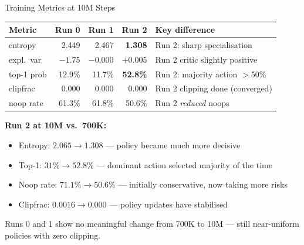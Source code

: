 \documentclass[aspectratio=169,11pt]{beamer}
\begin{document}
\begin{frame}{Training Metrics at 10M Steps}
  \footnotesize
  \begin{center}
  \begin{tabular}{lrrrl}
    \toprule
    \textbf{Metric} & \textbf{Run 0} & \textbf{Run 1} & \textbf{Run 2} & \textbf{Key difference} \\
    \midrule
    entropy     & 2.449 & 2.467 & \textcolor{good}{\textbf{1.308}} & Run 2: sharp specialisation \\
    expl.\ var  & $-1.75$ & $-0.000$ & \textcolor{good}{$+0.005$} & Run 2 critic slightly positive \\
    top-1 prob  & 12.9\% & 11.7\% & \textcolor{good}{\textbf{52.8\%}} & Run 2: majority action $>$50\% \\
    clipfrac    & 0.000 & 0.000 & 0.000 & Run 2 clipping done (converged) \\
    noop rate   & 61.3\% & 61.8\% & \textcolor{good}{50.6\%} & Run 2 \emph{reduced} noops \\
    \bottomrule
  \end{tabular}
  \end{center}

  \bigskip
  \textbf{Run 2 at 10M vs.\ 700K:}
  \begin{itemize}
    \item Entropy: $2.065 \to 1.308$ --- policy became much more decisive
    \item Top-1: $31\% \to 52.8\%$ --- dominant action selected majority of the time
    \item Noop rate: $71.1\% \to 50.6\%$ --- initially conservative, now taking more risks
    \item Clipfrac: $0.0016 \to 0.000$ --- policy updates have stabilised
  \end{itemize}

  \medskip
  Runs 0 and 1 show \alert{no meaningful change} from 700K to 10M ---
  still near-uniform policies with zero clipping.
\end{frame}
\end{document}
